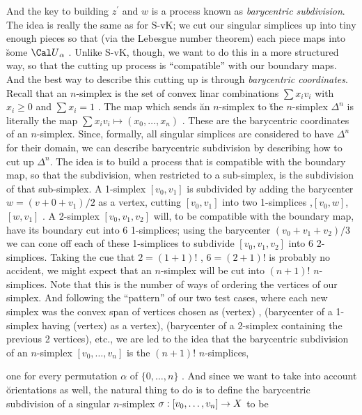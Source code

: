 And the key to building $z^\prime$ and $w$ is a process known as {\it barycentric subdivision}.
The idea is really the same as for S-vK; we cut our singular simplices up into tiny enough
pieces so that (via the Lebesgue number theorem) 
each piece maps into \u{some} ${\Cal U}_\alpha$ . Unlike S-vK, though, we want to do 
this in a more structured way, so that the cutting up process is ``compatible'' with our
boundary maps. And the best way to describe this cutting up is through {\it barycentric
coordinates}. Recall that an $n$-simplex is the set of convex linar combinations
$\sum x_i v_i$ with $x_i\geq 0$ and $\sum x_i=1$ . The map which sends \u{an}
$n$-simplex to \u{the} $n$-simplex $\Delta^n$ is literally the map 
$\sum x_i v_i \mapsto (x_0,\ldots ,x_n)$ . These are the barycentric coordinates of an $n$-simplex.
Since, formally, all singular simplices are considered to have $\Delta^n$ for their
domain, we can describe barycentric subdivision by describing how to cut up $\Delta^n$.
The idea is to build a process that is compatible with the boundary map, so that the
subdivision, when restricted to a sub-simplex, is the subdivision of that sub-simplex.
A 1-simplex $[v_0,v_1]$ is subdivided by adding the barycenter $w=(v+0+v_1)/2$ as a vertex,
cutting $[v_0,v_1]$ into two 1-simplices ,$[v_0,w]$,$[w,v_1]$ . A 2-simplex 
$[v_0,v_1,v_2]$ will, to be compatible with the boundary map,
have its boundary cut into 6 1-simplices; using the barycenter $(v_0+v_1+v_2)/3$
we can cone off each of these 1-simplices to subdivide $[v_0,v_1,v_2]$
into 6 2-simplices. Taking the cue that $2=(1+1)!$ , $6=(2+1)!$ is probably no accident, we
might expect that an $n$-simplex will be cut into $(n+1)!$ $n$-simplices. 
Note that this is the number of ways of ordering the vertices of our simplex. 
And following the ``pattern'' of our two test cases, where each new simplex was the convex
span of vertices chosen as (vertex) , (barycenter of a 1-simplex having (vertex) as a vertex),
(barycenter of a 2-simplex containing the previous 2 vertices), etc., we are led to the idea that
the barycentric subdivision of an $n$-simplex $[v_0,\ldots , v_n]$ is the 
$(n+1)!$ $n$-simplices, 


one for every permutation $\alpha$ of $\{0,\ldots ,n\}$ . And since we want to take into account
\u{orientations} as well, the natural thing to do is to define the barycentric subdivision of a singular
$n$-simplex $\sigma:[v_0,\ldots ,v_n]\rightarrow X$ to be

